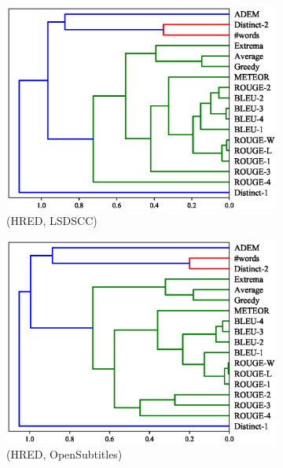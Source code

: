 \begin{figure}[htb]
    \begin{subfigure}{0.40\linewidth}
        \centering
        \includegraphics[width=\linewidth]{figure/plot/hierarchy/v2/pearson/hred/lsdscc/plot.eps}
        \caption{(HRED, LSDSCC)}
    \end{subfigure}%
    \begin{subfigure}{0.40\linewidth}
        \centering
        \includegraphics[width=\linewidth]{figure/plot/hierarchy/v2/pearson/hred/opensub/plot.eps}
        \caption{(HRED, OpenSubtitles)}
    \end{subfigure}%
    \begin{subfigure}{0.40\linewidth}
        \centering

\end{subfigure}
\end{figure}
